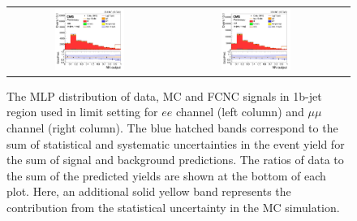 \begin{figure}[ht]
  \begin{center}
    \begin{tabular}{ccc}
      \includegraphics[width=0.45\textwidth]{figures/tW/fig/FCNC_Result/ee/H_MLP_tug_xjet_1bjet.png} &
      \includegraphics[width=0.45\textwidth]{figures/tW/fig/FCNC_Result/mumu/H_MLP_tug_xjet_1bjet.png}\\
    \end{tabular}
    \caption{The MLP distribution of data, MC and FCNC signals in 1b-jet region used in limit setting for $ee$ channel (left column) and $\mu\mu$ channel (right column). The blue hatched bands correspond to the sum of statistical and systematic uncertainties in the event yield for the sum of signal and background predictions. The ratios of data to the sum of the predicted yields are shown at the bottom of each plot. Here, an additional solid yellow band represents the contribution from the statistical uncertainty in the MC simulation.
    \label{fig:limit_FCNC}}
  \end{center}
\end{figure}





